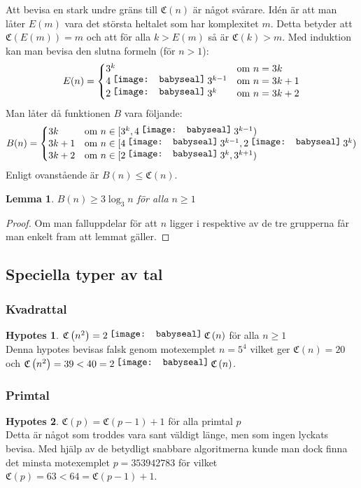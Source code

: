 \documentclass[a4paper,titlepage]{article}
\newcommand{\C}[1]{\mathfrak C \left( #1 \right)}
\newtheorem{lemma}{Lemma}
\theoremstyle{definition}
\newtheorem*{hypot}{Hypotes}
\newcommand*\foobar{\texttt{[image: babyseal]}}
\renewcommand\cdot{\mathbin{\raisebox{2pt}{\foobar}}}
\begin{document}
    Att bevisa en stark undre gräns till $\C{n}$ är något svårare.
    Idén är att man låter $E(m)$ vara det största heltalet som har komplexitet $m$.
    Detta betyder att $\C{E(m)} = m$ och att för alla $k > E(m)$ så är $\C{k}>m$.
    Med induktion kan man bevisa den slutna formeln (för $n>1$):
    $$ E(n) = \left\{ \begin{matrix*}[l] 3^k & \text{om } n=3k \\
                             4\cdot3^{k-1} & \text{om } n=3k+1 \\
                                 2\cdot3^k & \text{om } n=3k+2 \end{matrix*}
            \right.$$
    Man låter då funktionen $B$ vara följande:
    $$ B(n) = \left\{ \begin{matrix*}[l] 3k & \text{om } n\in[3^k,4\cdot3^{k-1}) \\
                                       3k+1 & \text{om } n\in[4\cdot3^{k-1},2\cdot3^k) \\
                                       3k+2 & \text{om } n\in[2\cdot3^k,3^{k+1}) \end{matrix*}
            \right.$$
    Enligt ovanstående är $B(n)\le\C{n}$.
    \begin{lemma}
        $B(n)\ge 3\log_3 n$ \quad för alla $n\ge1$
    \end{lemma}
    \begin{proof}
       Om man falluppdelar för att $n$ ligger i respektive av de tre grupperna
       får man enkelt fram att lemmat gäller.
    \end{proof}

    \subsection{Speciella typer av tal}

        \subsubsection{Kvadrattal}
        \begin{hypot}
            $\C{n^2}=2\cdot\C{n}$ \quad för alla $n\ge1$ \\
            Denna hypotes bevisas falsk genom motexemplet $n=5^4$ vilket ger $\C{n}=20$
            och $\C{n^2}=39<40=2\cdot\C{n}$.
        \end{hypot}

        \subsubsection{Primtal}
        \begin{hypot}
            $\C{p}=\C{p-1}+1$ \quad för alla primtal $p$ \\
            Detta är något som troddes vara sant väldigt länge, men som ingen
            lyckats bevisa. Med hjälp av de betydligt snabbare algoritmerna
            kunde man dock finna det minsta motexemplet $p = \num{353942783}$
            för vilket $\C{p} = 63 < 64 = \C{p-1}+1$.
        \end{hypot}
\end{document}

